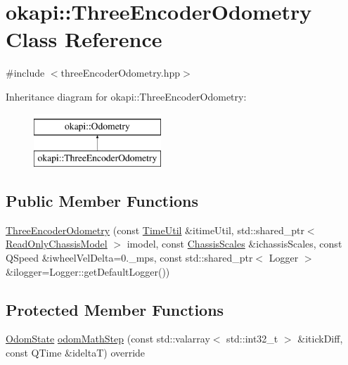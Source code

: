 \hypertarget{classokapi_1_1ThreeEncoderOdometry}{}\section{okapi\+::Three\+Encoder\+Odometry Class Reference}
\label{classokapi_1_1ThreeEncoderOdometry}


{\ttfamily \#include $<$three\+Encoder\+Odometry.\+hpp$>$}

Inheritance diagram for okapi\+::Three\+Encoder\+Odometry\+:\begin{figure}[H]
\begin{center}
\leavevmode
\includegraphics[height=2.000000cm]{classokapi_1_1ThreeEncoderOdometry}
\end{center}
\end{figure}
\subsection*{Public Member Functions}
\begin{DoxyCompactItemize}
\item 
\mbox{\hyperlink{classokapi_1_1ThreeEncoderOdometry_ad65a58475f76fbfa90207b39e02d96dc}{Three\+Encoder\+Odometry}} (const \mbox{\hyperlink{classokapi_1_1TimeUtil}{Time\+Util}} \&itime\+Util, std\+::shared\+\_\+ptr$<$ \mbox{\hyperlink{classokapi_1_1ReadOnlyChassisModel}{Read\+Only\+Chassis\+Model}} $>$ imodel, const \mbox{\hyperlink{classokapi_1_1ChassisScales}{Chassis\+Scales}} \&ichassis\+Scales, const Q\+Speed \&iwheel\+Vel\+Delta=0.\+\_\+mps, const std\+::shared\+\_\+ptr$<$ Logger $>$ \&ilogger=\+Logger\+::get\+Default\+Logger())
\end{DoxyCompactItemize}
\subsection*{Protected Member Functions}
\begin{DoxyCompactItemize}
\item 
\mbox{\hyperlink{structokapi_1_1OdomState}{Odom\+State}} \mbox{\hyperlink{classokapi_1_1ThreeEncoderOdometry_a8c0811674b9da0623a3cece56a25cca6}{odom\+Math\+Step}} (const std\+::valarray$<$ std\+::int32\+\_\+t $>$ \&itick\+Diff, const Q\+Time \&ideltaT) override
\end{DoxyCompactItemize}
